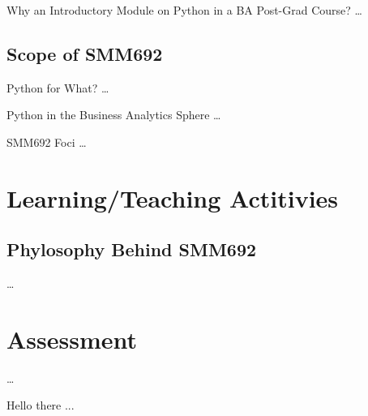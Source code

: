 \documentclass[aspectratio=1610]{beamer}
\begin{document}
\begin{frame}{Why an Introductory Module on Python in a BA Post-Grad Course?}
	\ldots
\end{frame}

\subsection{Scope of SMM692}

\begin{frame}{Python for What?}
\ldots	
\end{frame}

\begin{frame}{Python in the Business Analytics Sphere}
\ldots
\end{frame}

\begin{frame}{SMM692 Foci}
	\ldots
\end{frame}

\section{Learning/Teaching Actitivies}

\subsection{Phylosophy Behind SMM692}

\begin{frame}{}
\ldots
\end{frame}

\section{Assessment}

\begin{frame}{}
\ldots
\end{frame}

\begin{frame}{Hello there}
	...
\end{frame}
\end{document}
